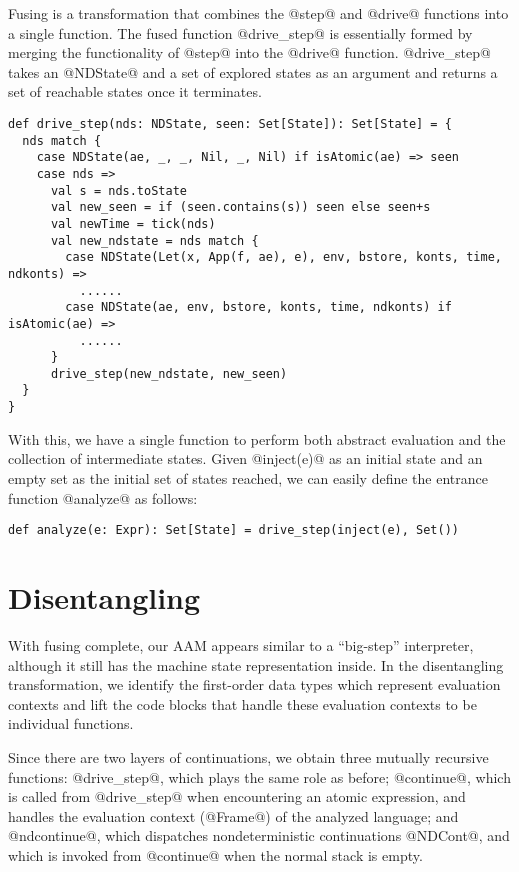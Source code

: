\documentclass[acmsmall]{acmart}\settopmatter{}
\begin{document}
Fusing is a transformation that combines the @step@ and @drive@ functions into a single
function.
The fused function @drive_step@ is essentially formed by merging the functionality of
@step@ into the @drive@ function.
@drive_step@ takes an @NDState@ and a set of explored states as an argument
and returns a set of reachable states once it terminates.

\begin{lstlisting}
def drive_step(nds: NDState, seen: Set[State]): Set[State] = {
  nds match {
    case NDState(ae, _, _, Nil, _, Nil) if isAtomic(ae) => seen
    case nds =>
      val s = nds.toState
      val new_seen = if (seen.contains(s)) seen else seen+s
      val newTime = tick(nds)
      val new_ndstate = nds match {
        case NDState(Let(x, App(f, ae), e), env, bstore, konts, time, ndkonts) =>
          ......
        case NDState(ae, env, bstore, konts, time, ndkonts) if isAtomic(ae) =>
          ......
      }
      drive_step(new_ndstate, new_seen)
  }
}
\end{lstlisting}

With this, we have a single function to perform both abstract evaluation and the collection of
intermediate states. Given @inject(e)@ as an initial state and an empty set as the
initial set of states reached, we can easily define the entrance function @analyze@ as
follows:

\begin{lstlisting}
def analyze(e: Expr): Set[State] = drive_step(inject(e), Set())
\end{lstlisting}

\section{Disentangling} \label{disen}

With fusing complete, our AAM
appears similar to a ``big-step'' interpreter, although it still has the machine
state representation inside.
In the disentangling transformation, we
identify the first-order data types which represent evaluation contexts
and lift the code blocks that handle these evaluation contexts to be individual functions.

Since there are two layers of continuations,
we obtain three mutually recursive functions: @drive_step@, which plays the same
role as before; @continue@, which is called from @drive_step@ when encountering an atomic 
expression, and handles the evaluation context (@Frame@) of the analyzed
language; and @ndcontinue@, which dispatches nondeterministic continuations @NDCont@,
and which is invoked from @continue@ when the normal stack is empty.
\end{document}
